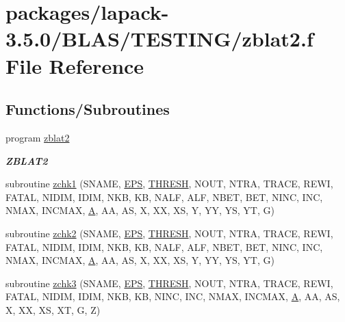 \hypertarget{zblat2_8f}{}\section{packages/lapack-\/3.5.0/\+B\+L\+A\+S/\+T\+E\+S\+T\+I\+N\+G/zblat2.f File Reference}
\label{zblat2_8f}
\subsection*{Functions/\+Subroutines}
\begin{DoxyCompactItemize}
\item 
program \hyperlink{group__complex16__blas__testing_gab9535100aaa9a63ed5652026fb8bf0e4}{zblat2}
\begin{DoxyCompactList}\small\item\em {\bfseries Z\+B\+L\+A\+T2} \end{DoxyCompactList}\item 
subroutine \hyperlink{zblat2_8f_a8bbecaad6e0c7955bb26a35899dbcc48}{zchk1} (S\+N\+A\+M\+E, \hyperlink{tukey_8c_a6ebf6899d6c1c8b7b9d09be872c05aae}{E\+P\+S}, \hyperlink{zlaqgs_8c_a0656018abfc9fa2821827415f5d5ea57}{T\+H\+R\+E\+S\+H}, N\+O\+U\+T, N\+T\+R\+A, T\+R\+A\+C\+E, R\+E\+W\+I, F\+A\+T\+A\+L, N\+I\+D\+I\+M, I\+D\+I\+M, N\+K\+B, K\+B, N\+A\+L\+F, A\+L\+F, N\+B\+E\+T, B\+E\+T, N\+I\+N\+C, I\+N\+C, N\+M\+A\+X, I\+N\+C\+M\+A\+X, \hyperlink{classA}{A}, A\+A, A\+S, X, X\+X, X\+S, Y, Y\+Y, Y\+S, Y\+T, G)
\item 
subroutine \hyperlink{zblat2_8f_ae4863a1b84cfa5425f063d25e0c8ba47}{zchk2} (S\+N\+A\+M\+E, \hyperlink{tukey_8c_a6ebf6899d6c1c8b7b9d09be872c05aae}{E\+P\+S}, \hyperlink{zlaqgs_8c_a0656018abfc9fa2821827415f5d5ea57}{T\+H\+R\+E\+S\+H}, N\+O\+U\+T, N\+T\+R\+A, T\+R\+A\+C\+E, R\+E\+W\+I, F\+A\+T\+A\+L, N\+I\+D\+I\+M, I\+D\+I\+M, N\+K\+B, K\+B, N\+A\+L\+F, A\+L\+F, N\+B\+E\+T, B\+E\+T, N\+I\+N\+C, I\+N\+C, N\+M\+A\+X, I\+N\+C\+M\+A\+X, \hyperlink{classA}{A}, A\+A, A\+S, X, X\+X, X\+S, Y, Y\+Y, Y\+S, Y\+T, G)
\item 
subroutine \hyperlink{zblat2_8f_a99c9f633332de648e159af16eef2229c}{zchk3} (S\+N\+A\+M\+E, \hyperlink{tukey_8c_a6ebf6899d6c1c8b7b9d09be872c05aae}{E\+P\+S}, \hyperlink{zlaqgs_8c_a0656018abfc9fa2821827415f5d5ea57}{T\+H\+R\+E\+S\+H}, N\+O\+U\+T, N\+T\+R\+A, T\+R\+A\+C\+E, R\+E\+W\+I, F\+A\+T\+A\+L, N\+I\+D\+I\+M, I\+D\+I\+M, N\+K\+B, K\+B, N\+I\+N\+C, I\+N\+C, N\+M\+A\+X, I\+N\+C\+M\+A\+X, \hyperlink{classA}{A}, A\+A, A\+S, X, X\+X, X\+S, X\+T, G, Z)

\end{DoxyCompactItemize}
